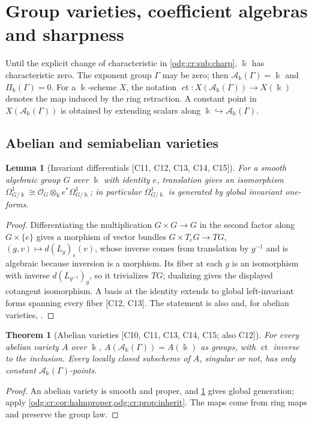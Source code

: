 \documentclass[11pt,oneside]{article}
\numberwithin{equation}{section}
\newtheorem{theorem}{Theorem}[section]
\newtheorem{lemma}[lemma]{Lemma}
\theoremstyle{definition}
\theoremstyle{remark}
\newcommand{\ct}{\operatorname{ct}}
\newcommand{\src}[1]{\textup{\textsf{\small[#1]}}}
\newcommand{\crA}{\mathcal A_\Bbbk(\Gamma)}
\newcommand{\crP}{\Pi_\Bbbk(\Gamma)}
\begin{document}
\section{Group varieties, coefficient algebras and sharpness}\label{odg:cr:sec:groups}

Until the explicit change of characteristic in \cref{odg:cr:sub:charp},
$\Bbbk$ has characteristic zero. The exponent group $\Gamma$ may be zero;
then $\crA=\Bbbk$ and $\crP=0$. For a $\Bbbk$-scheme $X$, the notation
$\ct:X(\crA)\to X(\Bbbk)$ denotes the map induced by the ring retraction.
A constant point in $X(\crA)$ is obtained by extending scalars along
$\Bbbk\hookrightarrow\crA$.

\subsection{Abelian and semiabelian varieties}\label{odg:cr:sub:abelian}

\begin{lemma}[Invariant differentials \src{C11, C12, C13, C14, C15}]\label{odg:cr:lem:invariant}
For a smooth algebraic group $G$ over $\Bbbk$ with identity $e$, translation gives an
isomorphism $\Omega^1_{G/\Bbbk}\cong\mathcal O_G\otimes_\Bbbk e^*\Omega^1_{G/\Bbbk}$; in
particular $\Omega^1_{G/\Bbbk}$ is generated by global invariant one-forms.
\end{lemma}
\begin{proof}
Differentiating the multiplication $G\times G\to G$ in the second factor along
$G\times\{e\}$ gives a morphism of vector bundles $G\times T_eG\to TG$,
$(g,v)\mapsto d(L_g)_e(v)$, whose inverse comes from translation by $g^{-1}$ and is
algebraic because inversion is a morphism. Its fiber at each $g$ is an
isomorphism with inverse $d(L_{g^{-1}})_g$, so it trivializes $TG$;
dualizing gives the displayed cotangent isomorphism. A basis at the
identity extends to global left-invariant forms spanning every fiber
\src{C12, C13}. The statement is
also \cite[Tag 047I]{StacksGroups} and, for abelian varieties,
\cite[Chapter IV, Proposition 6.4(b)]{MilneAV}.
\end{proof}

\begin{theorem}[Abelian varieties \src{C10, C11, C13, C14, C15; also C12}]\label{odg:cr:thm:abelian}
For every abelian variety $A$ over $\Bbbk$, $A(\crA)=A(\Bbbk)$ as groups, with $\ct$
inverse to the inclusion. Every locally closed subscheme of $A$, singular or not,
has only constant $\crA$-points.
\end{theorem}
\begin{proof}
An abelian variety is smooth and proper, and \cref{odg:cr:lem:invariant} gives
global generation; apply \cref{odg:cr:cor:hahnproper,odg:cr:prop:inherit}. The
maps come from ring maps and preserve the group law.
\end{proof}
\end{document}

